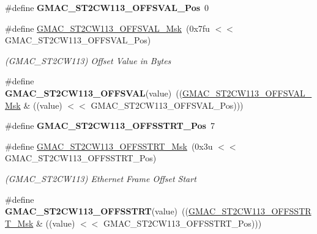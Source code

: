 \begin{DoxyCompactItemize}
\item 
\mbox{\label{group__SAME70__GMAC_gaa0e0b9bd4b2ba614240358f6e471edae}} 
\#define {\bfseries G\+M\+A\+C\+\_\+\+S\+T2\+C\+W113\+\_\+\+O\+F\+F\+S\+V\+A\+L\+\_\+\+Pos}~0
\item 
\mbox{\label{group__SAME70__GMAC_ga798c1052db3859641ebedee42e9f9305}} 
\#define \mbox{\hyperlink{group__SAME70__GMAC_ga798c1052db3859641ebedee42e9f9305}{G\+M\+A\+C\+\_\+\+S\+T2\+C\+W113\+\_\+\+O\+F\+F\+S\+V\+A\+L\+\_\+\+Msk}}~(0x7fu $<$$<$ G\+M\+A\+C\+\_\+\+S\+T2\+C\+W113\+\_\+\+O\+F\+F\+S\+V\+A\+L\+\_\+\+Pos)
\begin{DoxyCompactList}\small\item\em (G\+M\+A\+C\+\_\+\+S\+T2\+C\+W113) Offset Value in Bytes \end{DoxyCompactList}\item 
\mbox{\label{group__SAME70__GMAC_ga305246dcf7a4d9dfbf436a75795506e9}} 
\#define {\bfseries G\+M\+A\+C\+\_\+\+S\+T2\+C\+W113\+\_\+\+O\+F\+F\+S\+V\+AL}(value)~((\mbox{\hyperlink{group__SAMV71__GMAC_ga798c1052db3859641ebedee42e9f9305}{G\+M\+A\+C\+\_\+\+S\+T2\+C\+W113\+\_\+\+O\+F\+F\+S\+V\+A\+L\+\_\+\+Msk}} \& ((value) $<$$<$ G\+M\+A\+C\+\_\+\+S\+T2\+C\+W113\+\_\+\+O\+F\+F\+S\+V\+A\+L\+\_\+\+Pos)))
\item 
\mbox{\label{group__SAME70__GMAC_ga3569e6937c2a581779e794883d8191b6}} 
\#define {\bfseries G\+M\+A\+C\+\_\+\+S\+T2\+C\+W113\+\_\+\+O\+F\+F\+S\+S\+T\+R\+T\+\_\+\+Pos}~7
\item 
\mbox{\label{group__SAME70__GMAC_ga7fec80b0703ca994f3b8745a0ada2283}} 
\#define \mbox{\hyperlink{group__SAME70__GMAC_ga7fec80b0703ca994f3b8745a0ada2283}{G\+M\+A\+C\+\_\+\+S\+T2\+C\+W113\+\_\+\+O\+F\+F\+S\+S\+T\+R\+T\+\_\+\+Msk}}~(0x3u $<$$<$ G\+M\+A\+C\+\_\+\+S\+T2\+C\+W113\+\_\+\+O\+F\+F\+S\+S\+T\+R\+T\+\_\+\+Pos)
\begin{DoxyCompactList}\small\item\em (G\+M\+A\+C\+\_\+\+S\+T2\+C\+W113) Ethernet Frame Offset Start \end{DoxyCompactList}\item 
\mbox{\label{group__SAME70__GMAC_gab8330db368b0feab50274657c89ca80d}} 
\#define {\bfseries G\+M\+A\+C\+\_\+\+S\+T2\+C\+W113\+\_\+\+O\+F\+F\+S\+S\+T\+RT}(value)~((\mbox{\hyperlink{group__SAMV71__GMAC_ga7fec80b0703ca994f3b8745a0ada2283}{G\+M\+A\+C\+\_\+\+S\+T2\+C\+W113\+\_\+\+O\+F\+F\+S\+S\+T\+R\+T\+\_\+\+Msk}} \& ((value) $<$$<$ G\+M\+A\+C\+\_\+\+S\+T2\+C\+W113\+\_\+\+O\+F\+F\+S\+S\+T\+R\+T\+\_\+\+Pos)))

\end{DoxyCompactItemize}
